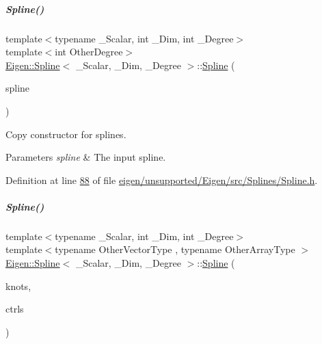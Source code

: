 \mbox{\label{group___splines___module_a0e6083605acc9f565e8bf4057b3f4bd3}} 
\subparagraph{\texorpdfstring{Spline()}{Spline()}\hspace{0.1cm}{\footnotesize\ttfamily [2/4]}}
{\footnotesize\ttfamily template$<$typename \+\_\+\+Scalar, int \+\_\+\+Dim, int \+\_\+\+Degree$>$ \\
template$<$int Other\+Degree$>$ \\
\hyperlink{group___splines___module_class_eigen_1_1_spline}{Eigen\+::\+Spline}$<$ \+\_\+\+Scalar, \+\_\+\+Dim, \+\_\+\+Degree $>$\+::\hyperlink{group___splines___module_class_eigen_1_1_spline}{Spline} (\begin{DoxyParamCaption}\item[{const \hyperlink{group___splines___module_class_eigen_1_1_spline}{Spline}$<$ \hyperlink{group___splines___module_a8cafd78b564825c76fbb3419653d9742}{Scalar}, \hyperlink{group___splines___module_a82c233f1d4719bc52397d64a6c96c5b0a25366e5e79da5355d259a71096d8d8a7}{Dimension}, Other\+Degree $>$ \&}]{spline }\end{DoxyParamCaption})\hspace{0.3cm}{\ttfamily [inline]}}



Copy constructor for splines. 


\begin{DoxyParams}{Parameters}
{\em spline} & The input spline. \\
\hline
\end{DoxyParams}


Definition at line \hyperlink{eigen_2unsupported_2_eigen_2src_2_splines_2_spline_8h_source_l00088}{88} of file \hyperlink{eigen_2unsupported_2_eigen_2src_2_splines_2_spline_8h_source}{eigen/unsupported/\+Eigen/src/\+Splines/\+Spline.\+h}.

\mbox{\label{group___splines___module_ac9dfdbeabf9573642d970e29e92dd2be}} 
\subparagraph{\texorpdfstring{Spline()}{Spline()}\hspace{0.1cm}{\footnotesize\ttfamily [3/4]}}
{\footnotesize\ttfamily template$<$typename \+\_\+\+Scalar, int \+\_\+\+Dim, int \+\_\+\+Degree$>$ \\
template$<$typename Other\+Vector\+Type , typename Other\+Array\+Type $>$ \\
\hyperlink{group___splines___module_class_eigen_1_1_spline}{Eigen\+::\+Spline}$<$ \+\_\+\+Scalar, \+\_\+\+Dim, \+\_\+\+Degree $>$\+::\hyperlink{group___splines___module_class_eigen_1_1_spline}{Spline} (\begin{DoxyParamCaption}\item[{const Other\+Vector\+Type \&}]{knots,  }\item[{const Other\+Array\+Type \&}]{ctrls }\end{DoxyParamCaption})\hspace{0.3cm}{\ttfamily [inline]}}



